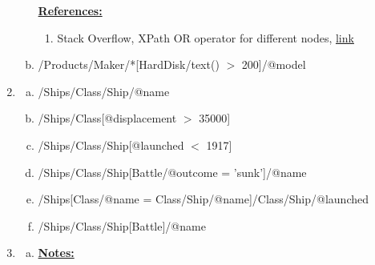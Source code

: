 \documentclass[12pt]{article}
\begin{document}
\begin{enumerate}[1.]
\begin{enumerate}[a)]
        \bigskip

        \underline{\textbf{References:}}

        \bigskip

        \begin{enumerate}[1)]
            \item Stack Overflow, XPath OR operator for different nodes, \href{https://stackoverflow.com/questions/5350666/xpath-or-operator-for-different-nodes}{link}
        \end{enumerate}

        \item /Products/Maker/*[HardDisk/text() $>$ 200]/@model
    \end{enumerate}

    \item

    \begin{enumerate}[a)]
        \item /Ships/Class/Ship/@name
        \item /Ships/Class[@displacement $>$ 35000]
        \item /Ships/Class/Ship[@launched $<$ 1917]
        \item /Ships/Class/Ship[Battle/@outcome = 'sunk']/@name
        \item /Ships[Class/@name = Class/Ship/@name]/Class/Ship/@launched
        \item /Ships/Class/Ship[Battle]/@name
    \end{enumerate}

    \item

    \begin{enumerate}[a)]
        \item

        \bigskip

        \underline{\textbf{Notes:}}

        \bigskip


\end{enumerate}
\end{enumerate}
\end{document}
